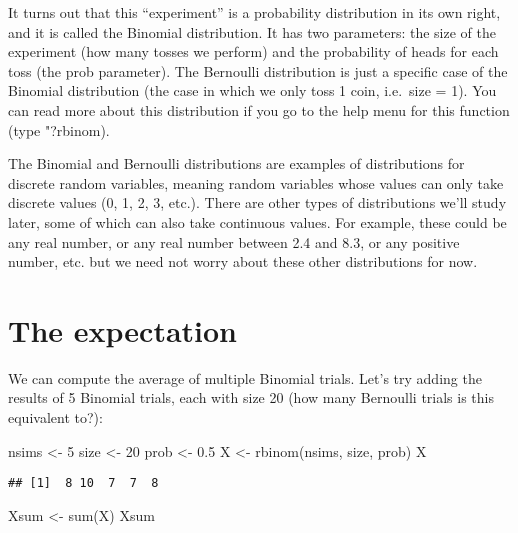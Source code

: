 \documentclass[
]{book}
\newenvironment{Shaded}{\begin{snugshade}}{\end{snugshade}}
\newcommand{\DecValTok}[1]{\textcolor[rgb]{0.00,0.00,0.81}{#1}}
\newcommand{\FloatTok}[1]{\textcolor[rgb]{0.00,0.00,0.81}{#1}}
\newcommand{\FunctionTok}[1]{\textcolor[rgb]{0.00,0.00,0.00}{#1}}
\newcommand{\NormalTok}[1]{#1}
\newcommand{\OtherTok}[1]{\textcolor[rgb]{0.56,0.35,0.01}{#1}}
\begin{document}
It turns out that this ``experiment'' is a probability distribution in its own right, and it is called the Binomial distribution. It has two parameters: the size of the experiment (how many tosses we perform) and the probability of heads for each toss (the prob parameter). The Bernoulli distribution is just a specific case of the Binomial distribution (the case in which we only toss 1 coin, i.e.~size = 1). You can read more about this distribution if you go to the help menu for this function (type "?rbinom).

The Binomial and Bernoulli distributions are examples of distributions for discrete random variables, meaning random variables whose values can only take discrete values (0, 1, 2, 3, etc.). There are other types of distributions we'll study later, some of which can also take continuous values. For example, these could be any real number, or any real number between 2.4 and 8.3, or any positive number, etc. but we need not worry about these other distributions for now.

\hypertarget{the-expectation}{%
\section{The expectation}\label{the-expectation}}

We can compute the average of multiple Binomial trials. Let's try adding the results of 5 Binomial trials, each with size 20 (how many Bernoulli trials is this equivalent to?):

\begin{Shaded}
\begin{Highlighting}[]
\NormalTok{nsims }\OtherTok{\textless{}{-}} \DecValTok{5}
\NormalTok{size }\OtherTok{\textless{}{-}} \DecValTok{20}
\NormalTok{prob }\OtherTok{\textless{}{-}} \FloatTok{0.5}
\NormalTok{X }\OtherTok{\textless{}{-}} \FunctionTok{rbinom}\NormalTok{(nsims, size, prob)}
\NormalTok{X}
\end{Highlighting}
\end{Shaded}

\begin{verbatim}
## [1]  8 10  7  7  8
\end{verbatim}

\begin{Shaded}
\begin{Highlighting}[]
\NormalTok{Xsum }\OtherTok{\textless{}{-}} \FunctionTok{sum}\NormalTok{(X)}
\NormalTok{Xsum}
\end{Highlighting}
\end{Shaded}
\end{document}
